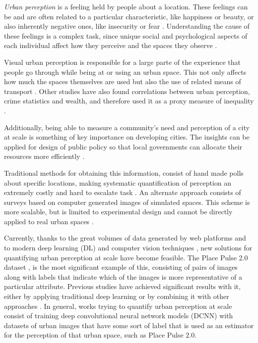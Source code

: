 \textit{Urban perception} is a feeling held by people about a location. These feelings can be and
are often related to a particular characteristic, like happiness or beauty, or also
inherently negative ones, like insecurity or fear \cite{tamara_judgments}. Understanding the
cause of these feelings is a complex task, since unique social and psychological aspects
of each individual affect how they perceive and the spaces they observe \cite{nasar_perception}.

Visual urban perception is  responsible for a large parte of the experience that people
go through while  being at or using an urban space. This not only affects how much the spaces
themselves are used \cite{khisty} but also the use of related means of transport \cite{antonakos}.
Other studies have also found correlations between urban perception, crime statistics \cite{tamara_judgments}
and wealth, and therefore used it as a proxy measure of inequality \cite{tamara_judgments,hidalgo_inequality, rossetti}.

Additionally, being able to measure a community's need and perception of a city at scale is something
of key importance on developing cities. The insights can be applied for design of public policy
so that local governments can allocate their resources more efficiently \cite{santani}.

Traditional methods for obtaining this information, consist of hand made polls
about specific locations, making systematic quantification of perception  an extremely costly and hard
to escalate task \cite{nasar_perception,clifton}. An alternate approach consists of surveys based on
computer generated images of simulated spaces. This scheme is more scalable, but is limited to experimental
design and cannot be directly applied to real urban spaces \cite{lain_grenspace,iglesias_perception}.

Currently, thanks to the great volumes of data generated by web platforms \cite{hidalgo_inequality}
and to modern deep learning (DL) and computer vision techniques \cite{lecun_dl}, new solutions for
quantifying urban perception at scale have become feasible. The Place Pulse 2.0 dataset \cite{hidalgo_placepulse},
is the most significant example of this, consisting of pairs of images
along with labels that indicate which of the images is more representative of a particular attribute.
Previous studies have achieved significant results with it, either by applying traditional deep learning \cite{hidalgo_placepulse}
or by combining it with other approaches \cite{rossetti, zhang_measuring}. In general, works trying to quantify
urban perception at scale consist of training deep convolutional neural network models (DCNN)
\cite{lecun_mnist} with datasets of urban images that have some sort of label that is used
as an estimator for the perception of that urban space, such as Place Pulse 2.0.

